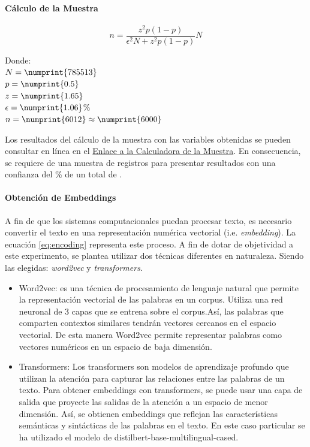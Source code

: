\documentclass[onecolumn, journal, english, 12pt, a4paper]{IEEEtran} %
\newcommand{\modelohuggingface}{distilbert-base-multilingual-cased}
\theoremstyle{definition}
\begin{document}
\paragraph{Cálculo de la Muestra}
\begin{equation*}
        n =\frac{z^2p(1-p) }{\epsilon^2N+z^2p(1-p)}N
\end{equation*}

Donde:\\
$N = \numprint{785513}$ \\
$p = \numprint{0.5}$ \\
$z = \numprint{1.65}$  \\
$\epsilon = \numprint{1.06}$\% \\
$n = \numprint{6012} \approx \numprint{6000}$

Los resultados del cálculo de la muestra con las variables obtenidas
se pueden consultar en línea en el
\href{https://www.calculator.net/sample-size-calculator.html?type=1&cl=90&ci=1.06&pp=50&ps=785513&x=Calculate}{Enlace
  a la Calculadora de la Muestra}. En consecuencia, se requiere de una
muestra de  registros para presentar resultados con una
confianza del \% de un total de .

\paragraph{Obtención de Embeddings}
A fin de que los sistemas computacionales puedan procesar texto, es
necesario convertir el texto en una representación numérica vectorial
(i.e. \emph{embedding}). La ecuación \eqref{eq:encoding} representa
este proceso. A fin de dotar de objetividad a este experimento, se
plantea utilizar dos técnicas diferentes en naturaleza. Siendo las
elegidas: \emph{word2vec} y \emph{transformers}.


\begin{itemize}
\item Word2vec: es una técnica de procesamiento de lenguaje natural
  que permite la representación vectorial de las palabras en un
  corpus. Utiliza una red neuronal de 3 capas que se entrena sobre el
  corpus.Así, las palabras que comparten contextos similares tendrán
  vectores cercanos en el espacio vectorial. De esta manera Word2vec
  permite representar palabras como vectores numéricos en un espacio
  de baja dimensión.
  \item Transformers: Los transformers son modelos de aprendizaje
      profundo que utilizan la atención para capturar las relaciones
      entre las palabras de un texto. Para obtener embeddings con
      transformers, se puede usar una capa de salida que proyecte las
      salidas de la atención a un espacio de menor dimensión. Así, se
      obtienen embeddings que reflejan las características semánticas
      y sintácticas de las palabras en el texto. En este caso
      particular se ha utilizado el modelo de \modelohuggingface.

\end{itemize}
\end{document}

